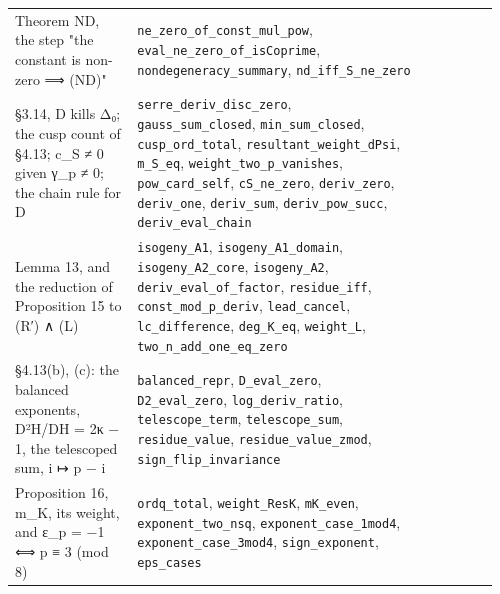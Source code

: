 \documentclass[11pt,a4paper]{article}
\theoremstyle{named}
\begin{document}
\begin{small}
\begin{longtable}{>{\raggedright\arraybackslash}p{0.242\linewidth}>{\raggedright\arraybackslash}p{0.574\linewidth}>{\raggedright\arraybackslash}p{0.143\linewidth}}
Theorem ND, the step "the constant is non-zero ⟹ (ND)" & \texttt{ne\_\allowbreak{}zero\_\allowbreak{}of\_\allowbreak{}const\_\allowbreak{}mul\_\allowbreak{}pow}, \texttt{eval\_\allowbreak{}ne\_\allowbreak{}zero\_\allowbreak{}of\_\allowbreak{}isCoprime}, \texttt{nondegeneracy\_\allowbreak{}summary}, \texttt{nd\_\allowbreak{}iff\_\allowbreak{}S\_\allowbreak{}ne\_\allowbreak{}zero} & 18 \\
§3.14, D kills Δ₀; the cusp count of §4.13; c\_S ≠ 0 given γ\_p ≠ 0; the chain rule for D & \texttt{serre\_\allowbreak{}deriv\_\allowbreak{}disc\_\allowbreak{}zero}, \texttt{gauss\_\allowbreak{}sum\_\allowbreak{}closed}, \texttt{min\_\allowbreak{}sum\_\allowbreak{}closed}, \texttt{cusp\_\allowbreak{}ord\_\allowbreak{}total}, \texttt{resultant\_\allowbreak{}weight\_\allowbreak{}dPsi}, \texttt{m\_\allowbreak{}S\_\allowbreak{}eq}, \texttt{weight\_\allowbreak{}two\_\allowbreak{}p\_\allowbreak{}vanishes}, \texttt{pow\_\allowbreak{}card\_\allowbreak{}self}, \texttt{cS\_\allowbreak{}ne\_\allowbreak{}zero}, \texttt{deriv\_\allowbreak{}zero}, \texttt{deriv\_\allowbreak{}one}, \texttt{deriv\_\allowbreak{}sum}, \texttt{deriv\_\allowbreak{}pow\_\allowbreak{}succ}, \texttt{deriv\_\allowbreak{}eval\_\allowbreak{}chain} & 19 \\
Lemma 13, and the reduction of Proposition 15 to (R′) ∧ (L) & \texttt{isogeny\_\allowbreak{}A1}, \texttt{isogeny\_\allowbreak{}A1\_\allowbreak{}domain}, \texttt{isogeny\_\allowbreak{}A2\_\allowbreak{}core}, \texttt{isogeny\_\allowbreak{}A2}, \texttt{deriv\_\allowbreak{}eval\_\allowbreak{}of\_\allowbreak{}factor}, \texttt{residue\_\allowbreak{}iff}, \texttt{const\_\allowbreak{}mod\_\allowbreak{}p\_\allowbreak{}deriv}, \texttt{lead\_\allowbreak{}cancel}, \texttt{lc\_\allowbreak{}difference}, \texttt{deg\_\allowbreak{}K\_\allowbreak{}eq}, \texttt{weight\_\allowbreak{}L}, \texttt{two\_\allowbreak{}n\_\allowbreak{}add\_\allowbreak{}one\_\allowbreak{}eq\_\allowbreak{}zero} & 20 \\
§4.13(b), (c): the balanced exponents, D²H/DH = 2κ − 1, the telescoped sum, i ↦ p − i & \texttt{balanced\_\allowbreak{}repr}, \texttt{D\_\allowbreak{}eval\_\allowbreak{}zero}, \texttt{D2\_\allowbreak{}eval\_\allowbreak{}zero}, \texttt{log\_\allowbreak{}deriv\_\allowbreak{}ratio}, \texttt{telescope\_\allowbreak{}term}, \texttt{telescope\_\allowbreak{}sum}, \texttt{residue\_\allowbreak{}value}, \texttt{residue\_\allowbreak{}value\_\allowbreak{}zmod}, \texttt{sign\_\allowbreak{}flip\_\allowbreak{}invariance} & 21 \\
Proposition 16, m\_K, its weight, and ε\_p = −1 ⟺ p ≡ 3 (mod 8) & \texttt{ordq\_\allowbreak{}total}, \texttt{weight\_\allowbreak{}ResK}, \texttt{mK\_\allowbreak{}even}, \texttt{exponent\_\allowbreak{}two\_\allowbreak{}nsq}, \texttt{exponent\_\allowbreak{}case\_\allowbreak{}1mod4}, \texttt{exponent\_\allowbreak{}case\_\allowbreak{}3mod4}, \texttt{sign\_\allowbreak{}exponent}, \texttt{eps\_\allowbreak{}cases} & 21 \\

\end{longtable}
\end{small}
\end{document}
